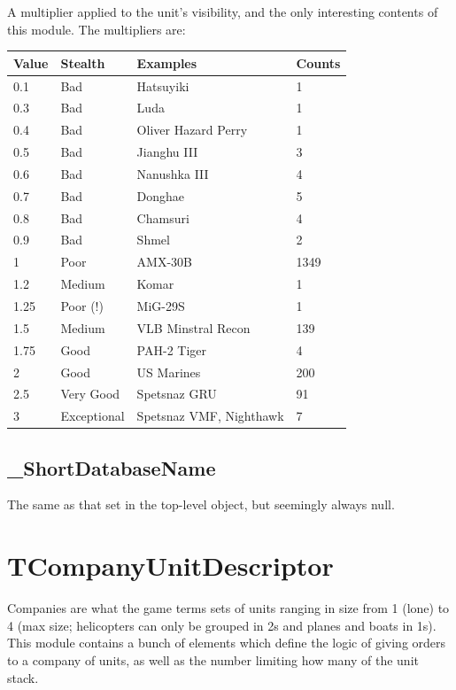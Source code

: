 \documentclass{article}
\begin{document}
A multiplier applied to the unit's visibility, and the only interesting contents of this module. The multipliers are:

\begin{center}
    \begin{tabular}{ | l | l | l | l |}
    \hline
	Value & Stealth & Examples & Counts\\ \hline
	0.1 & Bad & Hatsuyiki & 1\\
	0.3 & Bad & Luda & 1\\
	0.4 & Bad & Oliver Hazard Perry & 1\\
	0.5 & Bad & Jianghu III & 3\\
	0.6 & Bad & Nanushka III & 4\\
	0.7 & Bad & Donghae & 5\\
	0.8 & Bad & Chamsuri & 4\\
	0.9 & Bad & Shmel & 2\\
	1 & Poor & AMX-30B & 1349\\
	1.2 & Medium & Komar & 1\\
	1.25 & Poor (!) & MiG-29S & 1\\
	1.5 & Medium & VLB Minstral Recon & 139\\
	1.75 & Good & PAH-2 Tiger & 4\\
	2 & Good & US Marines & 200\\
	2.5 & Very Good & Spetsnaz GRU & 91\\
	3 & Exceptional & Spetsnaz VMF, Nighthawk & 7\\
    \hline
    \end{tabular}
\end{center}

\subsection{\_ShortDatabaseName}

The same as that set in the top-level object, but seemingly always null.

\section{TCompanyUnitDescriptor}

Companies are what the game terms sets of units ranging in size from 1 (lone) to 4 (max size; helicopters can only be grouped in 2s and planes and boats in 1s). This module contains a bunch of elements which define the logic of giving orders to a company of units, as well as the number limiting how many of the unit stack.
\end{document}
